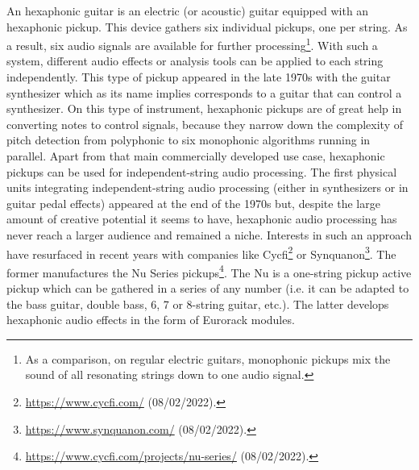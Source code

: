 \documentclass{article}
\begin{document}
An hexaphonic guitar is an electric (or acoustic) guitar equi\-pped with an hexaphonic pickup. This device gathers six individual pickups, one per string. As a result, six audio signals are available for further processing\footnote{As a comparison, on regular electric guitars, monophonic pickups mix the sound of all resonating strings down to one audio signal. }. With such a system, different audio effects or analysis tools can be applied to each string independently. This type of pickup appeared in the late 1970s with the guitar synthesizer which as its name implies corresponds to a guitar that can control a synthesizer. On this type of instrument, hexaphonic pickups are of great help in converting notes to control signals, because they narrow down the complexity of pitch detection from polyphonic to six monophonic algorithms running in parallel. Apart from that main commercially developed use case, hexaphonic pickups can be used for independent-string audio processing. The first physical units integrating independent-string audio processing (either in synthesizers or in guitar pedal effects) appeared at the end of the 1970s 
but, despite the large amount of creative potential it seems to have, hexaphonic audio processing has never reach a larger audience and remained a niche.  Interests in such an approach have resurfaced in recent years with companies like Cycfi\footnote{\url{https://www.cycfi.com/} (08/02/2022).} or Synquanon\footnote{\url{https://www.synquanon.com/} (08/02/2022).}. The former manufactures the Nu Series pickups\footnote{\url{https://www.cycfi.com/projects/nu-series/} (08/02/2022).}. The Nu is a one-string pickup active pickup which can be gathered in a series of any number (i.e. it can be adapted to the bass guitar, double bass, 6, 7 or 8-string guitar, etc.). The latter develops hexaphonic audio effects in the form of Eurorack modules. 
\end{document}
